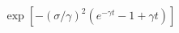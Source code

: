 \documentclass[12pt]{article}
\begin{document}
\begin{displaymath}
\exp\left[ -(\sigma/\gamma)^2 \left( e^{-\gamma t} - 1 + \gamma t\right) \right]
\end{displaymath}
\end{document}
